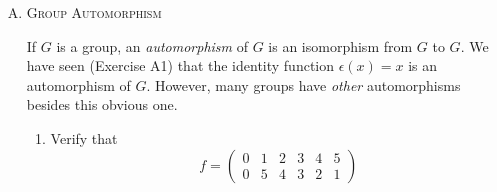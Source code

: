 \documentclass[twoside]{amsart}
\newcommand{\solution}{\textsc{Solution}\xspace}
\newcommand{\iso}{\cong}
\newcommand{\blank}{\vspace{5pt}}
\begin{document}
\begin{enumerate}[A.]
\begin{enumerate}[1]
      \blank \noindent \solution Let $f$ be $f(x) = x^{-1}$. This function
      is bijective. 
      \begin{align*}
         f(a \circ b) &= (a \circ b)^{-1} \\
                      &= b^{-1} \circ a^{-1} \\
         f(a)*f(b) &= f(b) \circ f(a) \\
                   &= b^{-1} \circ a^{-1}
      \end{align*}

      I've shown that $f$ is an isomorphism from $G$ to $H$ and therefore
      $G \iso H$.

      \blank
      \item Let $c$ be a fixed element of $G$. Let $H$ be a group with
      the same set as $G$, and with the opeation $x * y = xcy$. Prove
      that the function $f(x) = c^{-1}x$ is an isomorphism from $G$ to $H$.

      \blank \noindent \solution Injective: Assume $f(a)=f(b)$. Then
      we have $c^{-1}a = c^{-1}b$. Multiplying each side on the left by $c$
      we have $a=b$. Surjective: Let $y$ be an element in $H$. Then
      $f(x) = y$ for $x = cy$.

      Now check that $f(ab)=f(a)f(b)$.
      \begin{align*}
         f(ab) &= c^{-1}ab \\
         f(a)*f(b) &= f(a)cf(b) \\
                   &= c^{-1}acc^{-1}b \\
                   &= c^{-1}ab
      \end{align*}



   \end{enumerate}

   \item \textsc{Group Automorphism}

   If $G$ is a group, an \emph{automorphism} of $G$ is an isomorphism from
   $G$ to $G$. We have seen (Exercise A1) that the identity function 
   $\epsilon(x)=x$ is an automorphism of $G$. However, many groups have
   \emph{other} automorphisms besides this obvious one.

   \blank
   \begin{enumerate}[1]
      \item Verify that 
      \[
         f = 
            \begin{pmatrix}
               0 & 1 & 2 & 3 & 4 & 5 \\
               0 & 5 & 4 & 3 & 2 & 1 
            \end{pmatrix}
      \]


\end{enumerate}
\end{enumerate}
\end{document}
